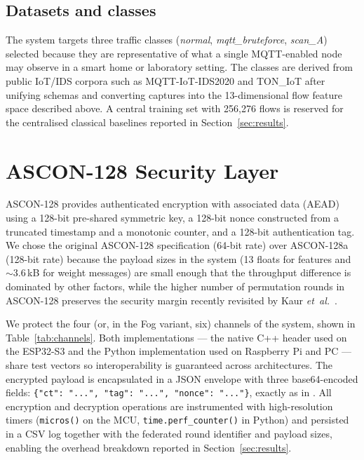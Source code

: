 \documentclass[runningheads]{llncs}
\begin{document}
\subsection{Datasets and classes}

The system targets three traffic classes (\emph{normal},
\emph{mqtt\_bruteforce}, \emph{scan\_A}) selected because they are
representative of what a single MQTT-enabled node may observe in a smart
home or laboratory setting. The classes are derived from public IoT/IDS
corpora such as MQTT-IoT-IDS2020 and TON\_IoT
\cite{moustafa2020toniot,ferrag2022edgeiiotset,neto2023ciciot} after
unifying schemas and converting captures into the 13-dimensional flow
feature space described above. A central training set with 256{,}276 flows
is reserved for the centralised classical baselines reported in
Section~\ref{sec:results}.

\section{ASCON-128 Security Layer}
\label{sec:ascon}

ASCON-128 provides authenticated encryption with associated data (AEAD)
using a 128-bit pre-shared symmetric key, a 128-bit nonce constructed
from a truncated timestamp and a monotonic counter, and a 128-bit
authentication tag. We chose the original ASCON-128 specification
(64-bit rate) over ASCON-128a (128-bit rate) because the payload sizes in
the system (13 floats for features and $\sim$3.6\,kB for weight messages)
are small enough that the throughput difference is dominated by other
factors, while the higher number of permutation rounds in ASCON-128
preserves the security margin recently revisited by Kaur
\textit{et~al.}~\cite{kaur2025ascon}.

We protect the four (or, in the Fog variant, six) channels of the system,
shown in Table~\ref{tab:channels}. Both implementations --- the native C++
header used on the ESP32-S3 and the Python implementation used on
Raspberry Pi and PC --- share test vectors so interoperability is
guaranteed across architectures. The encrypted payload is encapsulated in
a JSON envelope with three base64-encoded fields:
\verb|{"ct": "...", "tag": "...", "nonce": "..."}|, exactly as in
\cite{nist2025ascon}. All encryption and decryption operations are
instrumented with high-resolution timers (\texttt{micros()} on the MCU,
\texttt{time.perf\_counter()} in Python) and persisted in a CSV log together
with the federated round identifier and payload sizes, enabling the
overhead breakdown reported in Section~\ref{sec:results}.
\end{document}
